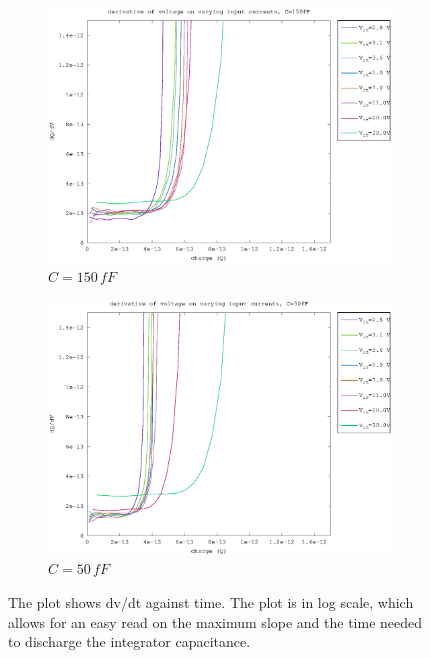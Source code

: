 \begin{figure}[h]
\begin{subfigure}[b]{0.475\textwidth}
    \includegraphics[width=\textwidth]{fig/d_slope_150fF.eps}
    \caption[]
        {$C=150\,fF$}    
        \label{fig:d_slopes_150fF}
\end{subfigure}
\quad
\begin{subfigure}[b]{0.475\textwidth}   
    \centering 
    \includegraphics[width=\textwidth]{fig/d_slope_50fF.eps}
    \caption[]
        {$C=50\,fF$}    
        \label{fig:d_slopes_50fF}
\end{subfigure}
\caption{The plot shows dv/dt against time. The plot is in log scale, which allows for an easy read on the maximum slope and the time needed to discharge the integrator capacitance. }
\label{fig:d_slopes}
\end{figure}



